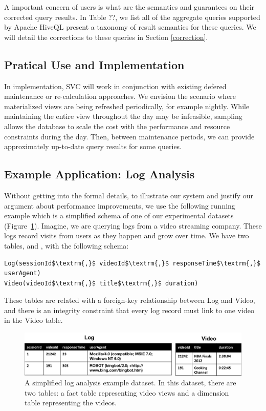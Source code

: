 A important concern of users is what are the semantics and guarantees on their corrected query results.
In Table ??, we list all of the aggregate queries supported by Apache HiveQL present a taxonomy of result semantics for these queries.
We will detail the corrections to these queries in Section \ref{correction}.

\subsection{Pratical Use and Implementation}
In implementation, SVC will work in conjunction with existing defered maintenance or re-calculation approaches.
We envision the scenario where materialized views are being refreshed periodically, for example nightly.
While maintaining the entire view throughout the day may be infeasible, sampling allows the database to scale the cost with the performance and resource constraints during the day.
Then, between maintenance periods, we can provide approximately up-to-date query results for some queries.

\subsection{Example Application: Log Analysis}
Without getting into the formal details, to illustrate our system and justify our argument about performance improvements, we use the following running example which is a 
simplified schema of one of our experimental datasets (Figure~\ref{example-1}).
Imagine, we are querying logs from a video streaming company. 
These logs record visits from users as they happen and grow over time.
We have two tables,  and , with the following schema:

\begin{lstlisting}[mathescape]
Log(sessionId$\textrm{,}$ videoId$\textrm{,}$ responseTime$\textrm{,}$ userAgent)
Video(videoId$\textrm{,}$ title$\textrm{,}$ duration)
\end{lstlisting}
These tables are related with a foreign-key relationship between
Log and Video, and there is an integrity constraint that every log
record must link to one video in the Video table.

\begin{figure}[ht!] 
\centering
\vspace{-0.75em}
 \includegraphics[width=\columnwidth]{figs/sample-clean-example.png}\vspace{-0.25em}
 \caption{A simplified log analysis example dataset. In this dataset, there are two tables: a fact table representing video views and a dimension table representing the videos.\label{example-1}}
\end{figure}

